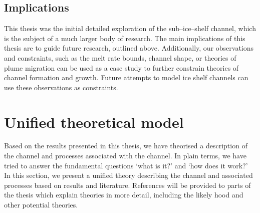 \subsection{Implications}

This thesis was the initial detailed exploration of the sub--ice--shelf channel, which is the subject of a much larger body of research. The main implications of this thesis are to guide future research, outlined above. Additionally, our observations and constraints, such as the melt rate bounds, channel shape, or theories of plume migration can be used as a case study to further constrain theories of channel formation and growth. Future attempts to model ice shelf channels can use these observations as constraints. 

\section{Unified theoretical model} \label{sec:unified}

Based on the results presented in this thesis, we have theorised a description of the channel and processes associated with the channel.  In plain terms, we have tried to answer the fundamental questions `what is it?' and `how does it work?' In this section, we present a unified theory describing the channel and associated processes based on results and literature.  References will be provided to parts of the thesis which explain theories in more detail, including the likely hood and other potential theories.

